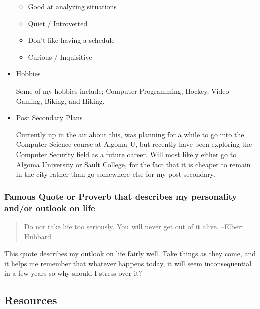 \documentclass[11pt]{article}
\begin{document}
\begin{itemize}
\begin{itemize}
\item Good at analyzing situations
\item Quiet / Introverted
\item Don't like having a schedule
\item Curious / Inquisitive
\end{itemize}

\item Hobbies
\label{sec:orgb658553}

Some of my hobbies include; Computer Programming, Hockey, Video Gaming, Biking, and Hiking.

\item Post Secondary Plans
\label{sec:org92db5e7}

Currently up in the air about this, was planning for a while to go into the Computer Science course at Algoma U, but recently have been exploring the Computer Security field as a future career. Will most likely either go to Algoma University or Sault College, for the fact that it is cheaper to remain in the city rather than go somewhere else for my post secondary.
\end{itemize}

\subsubsection*{Famous Quote or Proverb that describes my personality and/or outlook on life}
\label{sec:org81066f1}

\begin{quote}
Do not take life too seriously. You will never get out of it alive. --Elbert Hubbard
\end{quote}
This quote describes my outlook on life fairly well. Take things as they come, and it helps me remember that whatever happens today, it will seem inconsequential in a few years so why should I stress over it?

\subsection*{Resources}
\label{sec:org36028b9}
\end{document}
